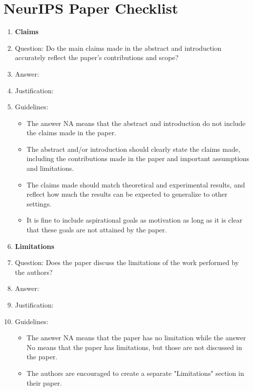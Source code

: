 \documentclass{article}
\begin{document}

\newpage
\section*{NeurIPS Paper Checklist}

\begin{enumerate}

\item {\bf Claims}
    \item[] Question: Do the main claims made in the abstract and introduction accurately reflect the paper's contributions and scope?
    \item[] Answer: \answerTODO{}
    \item[] Justification: \justificationTODO{}
    \item[] Guidelines:
    \begin{itemize}
        \item The answer NA means that the abstract and introduction do not include the claims made in the paper.
        \item The abstract and/or introduction should clearly state the claims made, including the contributions made in the paper and important assumptions and limitations.
        \item The claims made should match theoretical and experimental results, and reflect how much the results can be expected to generalize to other settings.
        \item It is fine to include aspirational goals as motivation as long as it is clear that these goals are not attained by the paper.
    \end{itemize}

\item {\bf Limitations}
    \item[] Question: Does the paper discuss the limitations of the work performed by the authors?
    \item[] Answer: \answerTODO{}
    \item[] Justification: \justificationTODO{}
    \item[] Guidelines:
    \begin{itemize}
        \item The answer NA means that the paper has no limitation while the answer No means that the paper has limitations, but those are not discussed in the paper.
        \item The authors are encouraged to create a separate "Limitations" section in their paper.
    \end{itemize}


\end{enumerate}
\end{document}
